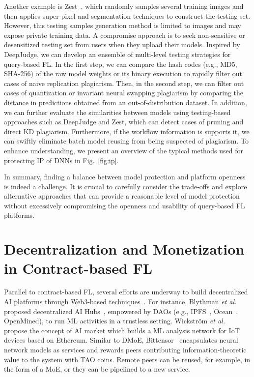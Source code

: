 \documentclass[journal]{IEEEtran}
\begin{document}
Another example is Zest~\cite{jia2022zest}, which randomly samples several training images and then applies super-pixel and segmentation techniques to construct the testing set.
However, this testing samples generation method is limited to images and may expose private training data.
A compromise approach is to seek non-sensitive or desensitized testing set from users when they upload their models.
Inspired by DeepJudge, we can develop an ensemble of multi-level testing strategies for query-based FL.
In the first step, we can compare the hash codes (e.g., MD5, SHA-256) of the raw model weights or its binary execution to rapidly filter out cases of naive replication plagiarism.
Then, in the second step, we can filter out cases of quantization or invariant neural swapping plagiarism by comparing the distance in predictions obtained from an out-of-distribution dataset.
In addition, we can further evaluate the similarities between models using testing-based approaches such as DeepJudge and Zest, which can detect cases of pruning and direct KD plagiarism.
Furthermore, if the workflow information is supports it, we can swiftly eliminate batch model reusing from being suspected of plagiarism.
To enhance understanding, we present an overview of the typical methods used for protecting IP of DNNs in Fig.~\ref{fig:ip}.

In summary, finding a balance between model protection and platform openness is indeed a challenge.
It is crucial to carefully consider the trade-offs and explore alternative approaches that can provide a reasonable level of model protection without excessively compromising the openness and usability of query-based FL platforms.



\section{Decentralization and Monetization in Contract-based FL} %
\label{apdx:decentral}
Parallel to contract-based FL, several efforts are underway to build decentralized AI platforms through Web3-based techniques~\cite{guo2023blockchain}. 
For instance, Blythman \textit{et al.} proposed decentralized AI Hubs~\cite{blythman2022decentralized}, empowered by DAOs (e.g., IPFS~\cite{benet2014ipfs}, Ocean~\cite{mcconaghy2022ocean}, OpenMined), to run ML activities in a trustless setting.
Wickstr{\"o}m \textit{et al.}~\cite{wickstrom2022decentralizing} propose the concept of AI market which builds a ML analysis network for IoT devices based on Ethereum.
Similar to DMoE, Bittensor~\cite{steeves2022incentivizing} encapsulates neural network models as services and rewards peers contributing information-theoretic value to the system with TAO coins. 
Remote peers can be reused, for example, in the form of a MoE, or they can be pipelined to a new service.
\end{document}
